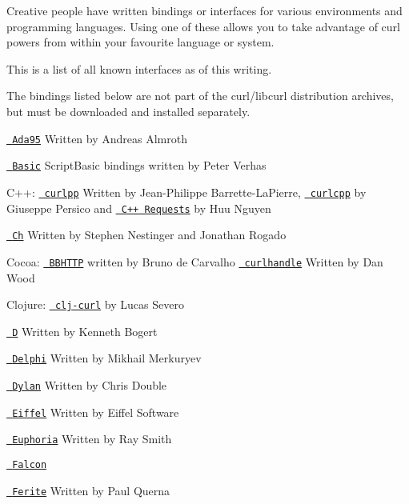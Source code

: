 Creative people have written bindings or interfaces for various environments and programming languages. Using one of these allows you to take advantage of curl powers from within your favourite language or system.

This is a list of all known interfaces as of this writing.

The bindings listed below are not part of the curl/libcurl distribution archives, but must be downloaded and installed separately.

\href{https://web.archive.org/web/20070403105909/www.almroth.com/adacurl/index.html}{\texttt{ Ada95}} Written by Andreas Almroth

\href{https://scriptbasic.com/}{\texttt{ Basic}} Script\+Basic bindings written by Peter Verhas

C++\+: \href{https://curlpp.org/}{\texttt{ curlpp}} Written by Jean-\/\+Philippe Barrette-\/\+La\+Pierre, \href{https://github.com/JosephP91/curlcpp}{\texttt{ curlcpp}} by Giuseppe Persico and \href{https://github.com/whoshuu/cpr}{\texttt{ C++ Requests}} by Huu Nguyen

\href{https://chcurl.sourceforge.io/}{\texttt{ Ch}} Written by Stephen Nestinger and Jonathan Rogado

Cocoa\+: \href{https://github.com/brunodecarvalho/BBHTTP}{\texttt{ BBHTTP}} written by Bruno de Carvalho \href{https://github.com/karelia/curlhandle}{\texttt{ curlhandle}} Written by Dan Wood

Clojure\+: \href{https://github.com/lsevero/clj-curl}{\texttt{ clj-\/curl}} by Lucas Severo

\href{https://dlang.org/library/std/net/curl.html}{\texttt{ D}} Written by Kenneth Bogert

\href{https://github.com/Mercury13/curl4delphi}{\texttt{ Delphi}} Written by Mikhail Merkuryev

\href{https://dylanlibs.sourceforge.io/}{\texttt{ Dylan}} Written by Chris Double

\href{https://room.eiffel.com/library/curl}{\texttt{ Eiffel}} Written by Eiffel Software

\href{https://web.archive.org/web/20050204080544/rays-web.com/eulibcurl.htm}{\texttt{ Euphoria}} Written by Ray Smith

\href{http://www.falconpl.org/index.ftd?page_id=prjs&prj_id=curl}{\texttt{ Falcon}}

\href{https://web.archive.org/web/20150102192018/ferite.org/}{\texttt{ Ferite}} Written by Paul Querna

